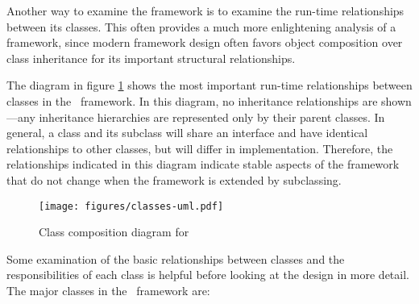 Another way to examine the framework is to examine the run-time
relationships between its classes.  This often provides a much more
enlightening analysis of a framework, since modern framework design
often favors object composition over class inheritance for its
important structural relationships. \cite[p. 20]{gamma:95}

The diagram in figure \ref{classes-uml} shows the
most important run-time relationships between classes in the
\aicat\ framework.  In this diagram, no inheritance
relationships are shown---any inheritance hierarchies are represented
only by their parent classes.  In general, a class and its subclass
will share an interface and have identical relationships to other
classes, but will differ in implementation.  Therefore, the
relationships indicated in this diagram indicate stable aspects of the
framework that do not change when the framework is extended by
subclassing.

\begin{figure}
\texttt{[image: figures/classes-uml.pdf]}
\caption{Class composition diagram for \aicat}
\label{classes-uml}
\end{figure}

Some examination of the basic relationships between classes and the
responsibilities of each class is helpful before looking at the design
in more detail.  The major classes in the \aicat\ framework
are:

